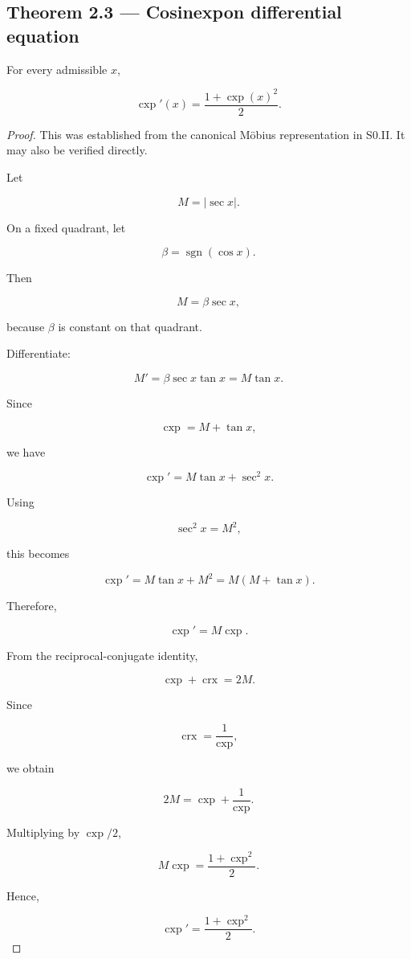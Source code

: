 \documentclass[11pt,oneside,openany]{book}
\newcommand{\PCsubsection}[1]{%
  \subsection*{#1}%
}
\begin{document}
\PCsubsection{Theorem 2.3 --- Cosinexpon differential equation}

For every admissible \(x\),

\[
\boxed{ \operatorname{cxp}'(x) = \frac{1+\operatorname{cxp}(x)^2}{2} }.
\]

\begin{proof}
This was established from the canonical Möbius representation in S0.II. It may also be verified directly.

Let

\[
M=|\sec x|.
\]

On a fixed quadrant, let

\[
\beta=\operatorname{sgn}(\cos x).
\]

Then

\[
M=\beta\sec x,
\]

because \(\beta\) is constant on that quadrant.

Differentiate:

\[
M' = \beta\sec x\tan x = M\tan x.
\]

Since

\[
\operatorname{cxp} = M+\tan x,
\]

we have

\[
\operatorname{cxp}' = M\tan x+\sec^2x.
\]

Using

\[
\sec^2x=M^2,
\]

this becomes

\[
\operatorname{cxp}' = M\tan x+M^2 = M(M+\tan x).
\]

Therefore,

\[
\operatorname{cxp}' = M\operatorname{cxp}.
\]

From the reciprocal-conjugate identity,

\[
\operatorname{cxp} + \operatorname{crx} = 2M.
\]

Since

\[
\operatorname{crx} = \frac1{\operatorname{cxp}},
\]

we obtain

\[
2M = \operatorname{cxp} + \frac1{\operatorname{cxp}}.
\]

Multiplying by \(\operatorname{cxp}/2\),

\[
M\operatorname{cxp} = \frac{1+\operatorname{cxp}^2}{2}.
\]

Hence,

\[
\boxed{ \operatorname{cxp}' = \frac{1+\operatorname{cxp}^2}{2} }.
\]

\end{proof}
\end{document}
